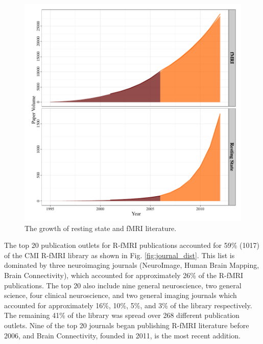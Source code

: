 \documentclass[5p]{elsarticle}
\begin{document}
\begin{figure}
  \begin{center}
    \includegraphics[width=\linewidth]{figures/overall_growth}%
    \caption{The growth of resting state and fMRI literature.
        \label{fig:overallgrowth}
    }
  \end{center}
\end{figure}


The top 20 publication outlets for R-fMRI publications accounted for 59\%
(1017) of the CMI R-fMRI library as shown in Fig. \ref{fig:journal_dist}.
This list is dominated by three neuroimaging journals (NeuroImage, Human
Brain Mapping, Brain Connectivity), which accounted for approximately 26\%
of the R-fMRI publications. The top 20 also include nine general
neuroscience, two general science, four clinical neuroscience, and two
general imaging journals which accounted for approximately 16\%, 10\%,
5\%, and 3\% of the library respectively. The remaining 41\% of the
library was spread over 268 different publication outlets. Nine of the top
20 journals began publishing R-fMRI literature before 2006, and Brain
Connectivity, founded in 2011, is the most recent addition.  
\end{document}

